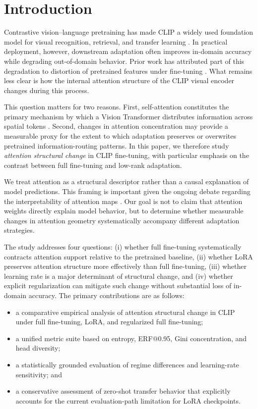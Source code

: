 \documentclass[10pt]{article}
\begin{document}
\section{Introduction}
Contrastive vision--language pretraining has made CLIP a widely used foundation model for visual recognition, retrieval, and transfer learning \citep{radford2021learning}. In practical deployment, however, downstream adaptation often improves in-domain accuracy while degrading out-of-domain behavior. Prior work has attributed part of this degradation to distortion of pretrained features under fine-tuning \citep{kumar2022finetuning,wortsman2022robust}. What remains less clear is how the internal attention structure of the CLIP visual encoder changes during this process.

This question matters for two reasons. First, self-attention constitutes the primary mechanism by which a Vision Transformer distributes information across spatial tokens \citep{dosovitskiy2021image}. Second, changes in attention concentration may provide a measurable proxy for the extent to which adaptation preserves or overwrites pretrained information-routing patterns. In this paper, we therefore study \emph{attention structural change} in CLIP fine-tuning, with particular emphasis on the contrast between full fine-tuning and low-rank adaptation.

We treat attention as a structural descriptor rather than a causal explanation of model predictions. This framing is important given the ongoing debate regarding the interpretability of attention maps \citep{jain2019attention,wiegreffe2019attention}. Our goal is not to claim that attention weights directly explain model behavior, but to determine whether measurable changes in attention geometry systematically accompany different adaptation strategies.

The study addresses four questions: (i) whether full fine-tuning systematically contracts attention support relative to the pretrained baseline, (ii) whether LoRA preserves attention structure more effectively than full fine-tuning, (iii) whether learning rate is a major determinant of structural change, and (iv) whether explicit regularization can mitigate such change without substantial loss of in-domain accuracy. The primary contributions are as follows:
\begin{itemize}
    \item a comparative empirical analysis of attention structural change in CLIP under full fine-tuning, LoRA, and regularized full fine-tuning;
    \item a unified metric suite based on entropy, ERF@0.95, Gini concentration, and head diversity;
    \item a statistically grounded evaluation of regime differences and learning-rate sensitivity; and
    \item a conservative assessment of zero-shot transfer behavior that explicitly accounts for the current evaluation-path limitation for LoRA checkpoints.
\end{itemize}
\end{document}
